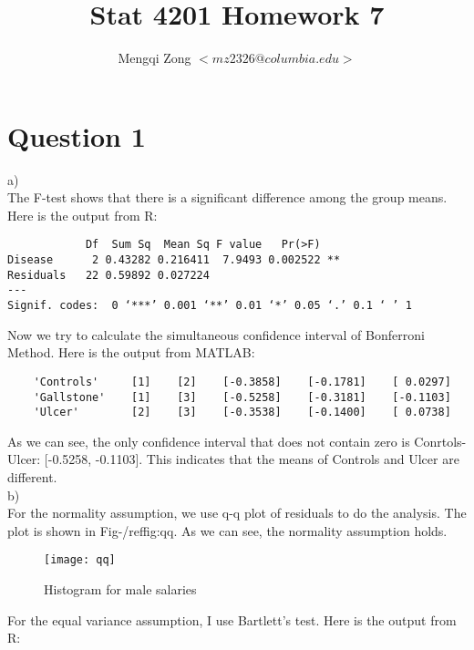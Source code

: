 \documentclass[12pt]{article}
\title{Stat 4201 Homework 7}
\author{Mengqi Zong $<mz2326@columbia.edu>$}
\begin{document}
\maketitle

\setlength{\parindent}{0in}

\section*{Question 1}

a) \\

The F-test shows that there is a significant difference among the
group means. Here is the output from R:

\begin{verbatim}
            Df  Sum Sq  Mean Sq F value   Pr(>F)   
Disease      2 0.43282 0.216411  7.9493 0.002522 **
Residuals   22 0.59892 0.027224                    
---
Signif. codes:  0 ‘***’ 0.001 ‘**’ 0.01 ‘*’ 0.05 ‘.’ 0.1 ‘ ’ 1 
\end{verbatim}

Now we try to calculate the  simultaneous confidence interval of
Bonferroni Method. Here is the output from MATLAB:

\begin{verbatim}
    'Controls'     [1]    [2]    [-0.3858]    [-0.1781]    [ 0.0297]
    'Gallstone'    [1]    [3]    [-0.5258]    [-0.3181]    [-0.1103]
    'Ulcer'        [2]    [3]    [-0.3538]    [-0.1400]    [ 0.0738]
\end{verbatim}

As we can see, the only confidence interval that does not contain zero
is Conrtols-Ulcer: [-0.5258, -0.1103]. This indicates that the means
of Controls and Ulcer are different. \\

b) \\

For the normality assumption, we use q-q plot of residuals to do
the analysis. The plot is shown in Fig-/ref{fig:qq}. As we can see,
the normality assumption holds.

\begin{figure}[ht!]
  \centering
  \texttt{[image: qq]}
  \caption{Histogram for male salaries \label{fig:qq}}
\end{figure}

For the equal variance assumption, I use Bartlett's test. Here is the
output from R:
\end{document}
